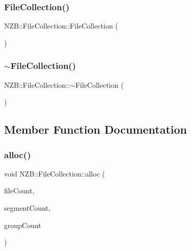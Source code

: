 \hypertarget{class_n_z_b_1_1_file_collection_a1eeded48503a89ccc75e7446df3f7e3f}{}\label{class_n_z_b_1_1_file_collection_a1eeded48503a89ccc75e7446df3f7e3f} 
\subsubsection{\texorpdfstring{File\+Collection()}{FileCollection()}\hspace{0.1cm}{\footnotesize\ttfamily [4/4]}}
{\footnotesize\ttfamily N\+Z\+B\+::\+File\+Collection\+::\+File\+Collection (\begin{DoxyParamCaption}\item[{const \hyperlink{class_n_z_b_1_1_file_collection}{File\+Collection} \&}]{ }\end{DoxyParamCaption})\hspace{0.3cm}{\ttfamily [delete]}}

\hypertarget{class_n_z_b_1_1_file_collection_a6d6986c488c8124efea37ef187589b88}{}\label{class_n_z_b_1_1_file_collection_a6d6986c488c8124efea37ef187589b88} 
\subsubsection{\texorpdfstring{$\sim$\+File\+Collection()}{~FileCollection()}}
{\footnotesize\ttfamily N\+Z\+B\+::\+File\+Collection\+::$\sim$\+File\+Collection (\begin{DoxyParamCaption}{ }\end{DoxyParamCaption})}



\subsection{Member Function Documentation}
\hypertarget{class_n_z_b_1_1_file_collection_a4caeac68cec4f2bd02fe82255ba52d33}{}\label{class_n_z_b_1_1_file_collection_a4caeac68cec4f2bd02fe82255ba52d33} 
\subsubsection{\texorpdfstring{alloc()}{alloc()}}
{\footnotesize\ttfamily void N\+Z\+B\+::\+File\+Collection\+::alloc (\begin{DoxyParamCaption}\item[{int}]{file\+Count,  }\item[{int}]{segment\+Count,  }\item[{int}]{group\+Count }\end{DoxyParamCaption})}

